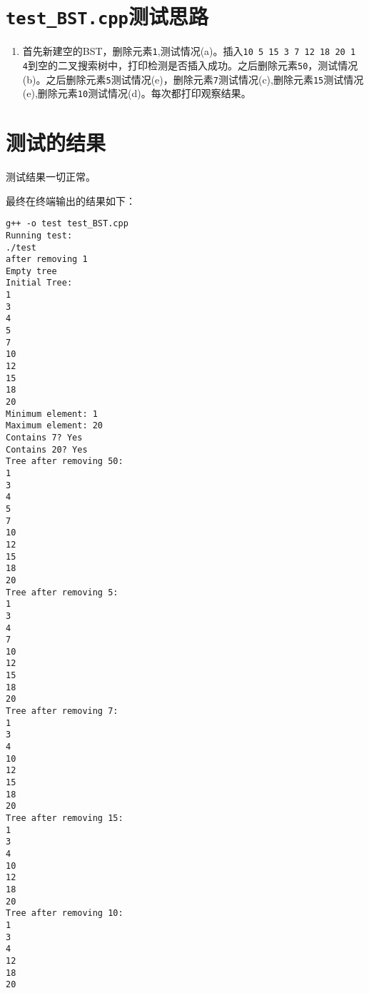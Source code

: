 \documentclass[UTF8]{ctexart}
\begin{document}
\section{\texttt{test\_BST.cpp}测试思路}
\begin{enumerate}
	\item 
	首先新建空的BST，删除元素\texttt{1},测试情况(a)。插入\texttt{10 5 15 3 7 12 18 20 1 4}到空的二叉搜索树中，打印检测是否插入成功。之后删除元素\texttt{50}，测试情况(b)。之后删除元素\texttt{5}测试情况(e)，删除元素\texttt{7}测试情况(c),删除元素\texttt{15}测试情况(e),删除元素\texttt{10}测试情况(d)。每次都打印观察结果。
\end{enumerate}

\section{测试的结果}

测试结果一切正常。

最终在终端输出的结果如下：
\begin{lstlisting}
g++ -o test test_BST.cpp
Running test:
./test
after removing 1
Empty tree
Initial Tree:
1
3
4
5
7
10
12
15
18
20
Minimum element: 1
Maximum element: 20
Contains 7? Yes
Contains 20? Yes
Tree after removing 50:
1
3
4
5
7
10
12
15
18
20
Tree after removing 5:
1
3
4
7
10
12
15
18
20
Tree after removing 7:
1
3
4
10
12
15
18
20
Tree after removing 15:
1
3
4
10
12
18
20
Tree after removing 10:
1
3
4
12
18
20
\end{lstlisting}
\end{document}
